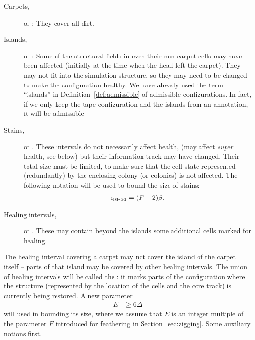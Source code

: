 \documentclass[12pt]{memoir}
\renewcommand{\ge}{\geq}
\newcommand{\E}{E}
\newcommand{\F}{F}
\newcommand{\cns}[1]{c_{\textrm{\upshape #1}}}
\begin{document}
\begin{description}

\item[Carpets,] or : They cover all dirt.

\item[Islands,] or : 
Some of the structural fields in even their non-carpet cells
may have been affected (initially at the time when the head left the carpet).
They may not fit into the simulation structure, so they
may need to be changed to make the configuration healthy.
We have already used the term ``islands'' in Definition~\ref{def:admissible} of
admissible configurations.
In fact, if we only keep the tape configuration and the islands from an annotation,
it will be admissible.

\item[Stains,] or .
These intervals do not necessarily affect health, (may affect \emph{super} health, see below)
but their information track may have changed.
Their total size must be limited, to make sure that the cell state represented (redundantly) by the
enclosing colony (or colonies) is not affected.
The following notation will be used to bound the size of stains:
\begin{align}\label{eq:isl-bd}
   \cns{isl-bd} = (\F+2)\beta.
 \end{align}

\item[Healing intervals,] or .
These may contain beyond the islands some additional cells marked for healing.
\end{description}

The healing interval covering a carpet may not cover the island of the carpet
itself -- parts of that island may be covered by other healing intervals.
The union of healing intervals will be called the : 
it marks parts of the configuration where the
structure (represented by the location of the cells and the core track) 
is currently being restored.
A new parameter 
\begin{align}\label{eq:expansion}
                          \E  &\ge 6\Delta %
 \end{align}
will used in bounding its size, where we assume that \( \E \) is an integer multiple of
the parameter \( \F \) introduced for feathering in Section~\ref{sec:zigging}.
Some auxiliary notions first.
\end{document}
